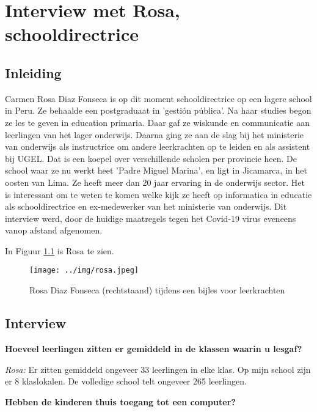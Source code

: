 
\chapter{Interview met Rosa, schooldirectrice}
\label{ch:interviewRosa}

\section{Inleiding}
Carmen Rosa Diaz Fonseca is op dit moment schooldirectrice op een lagere school in Peru. Ze behaalde een postgraduaat in 'gestión pública'. Na haar studies begon ze les te geven in education primaria. Daar gaf ze wiskunde en communicatie aan leerlingen van het lager onderwijs. Daarna ging ze aan de slag bij het ministerie van onderwijs als instructrice om andere leerkrachten op te leiden en als assistent bij UGEL. Dat is een koepel over verschillende scholen per provincie heen. De school waar ze nu werkt heet 'Padre Miguel Marina', en ligt in Jicamarca, in het oosten van Lima. Ze heeft meer dan 20 jaar ervaring in de onderwijs sector. Het is interessant om te weten te komen welke kijk ze heeft op informatica in educatie als schooldirectrice en ex-medewerker van het ministerie van onderwijs. Dit interview werd, door de huidige maatregels tegen het Covid-19 virus eveneens vanop afstand afgenomen.

In Figuur \ref{rosa} is Rosa te zien.

\begin{figure}[h!]
	\texttt{[image: ../img/rosa.jpeg]}
	\caption{Rosa Diaz Fonseca (rechtstaand) tijdens een bijles voor leerkrachten }
	\label{rosa}
\end{figure}


\section{Interview}

\textbf{Hoeveel leerlingen zitten er gemiddeld in de klassen waarin u lesgaf?}

\textit{Rosa:} Er zitten gemiddeld ongeveer 33 leerlingen in elke klas. Op mijn school zijn er 8 klaslokalen. De volledige school telt ongeveer 265 leerlingen.

\textbf{Hebben de kinderen thuis toegang tot een computer?}

